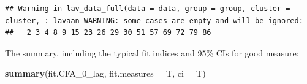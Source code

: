 \documentclass[]{article}
\newenvironment{Shaded}{\begin{snugshade}}{\end{snugshade}}
\newcommand{\KeywordTok}[1]{\textcolor[rgb]{0.13,0.29,0.53}{\textbf{#1}}}
\newcommand{\DataTypeTok}[1]{\textcolor[rgb]{0.13,0.29,0.53}{#1}}
\newcommand{\NormalTok}[1]{#1}
\begin{document}
\begin{verbatim}
## Warning in lav_data_full(data = data, group = group, cluster = cluster, : lavaan WARNING: some cases are empty and will be ignored:
##   2 3 4 8 9 15 23 26 29 30 51 57 69 72 79 86
\end{verbatim}

The summary, including the typical fit indices and 95\% CIs for good
measure:

\begin{Shaded}
\begin{Highlighting}[]
\KeywordTok{summary}\NormalTok{(fit.CFA_0_lag, }
        \DataTypeTok{fit.measures =}\NormalTok{ T,}
        \DataTypeTok{ci =}\NormalTok{ T)}
\end{Highlighting}
\end{Shaded}
\end{document}
